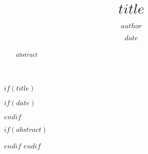 $if(title)$
  \title{$title$}
  \author{$author$}

  $if(date)$
    \date{$date$}
  $endif$

  \maketitle

  $if(abstract)$
    \begin{abstract}
      $abstract$
    \end{abstract}   
  $endif$
$endif$
